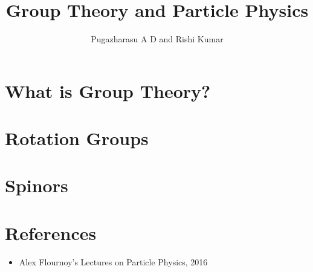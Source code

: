 \documentclass[]{article}
\title{Group Theory and Particle Physics}
\author{Pugazharasu A D and Rishi Kumar}
\begin{document}
\maketitle

\begin{abstract}

\end{abstract}

\section{What is Group Theory?}

\section{Rotation Groups}

\section{Spinors}


\section*{References}
\begin{itemize}
\item Alex Flournoy's Lectures on Particle Physics, 2016
\end{itemize}
\end{document}
